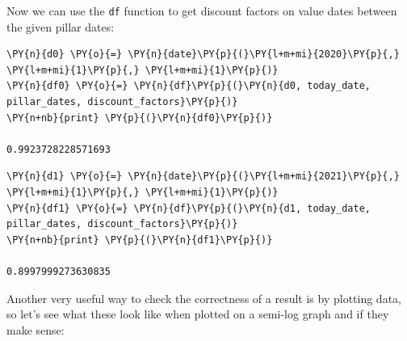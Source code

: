 Now we can use the \texttt{df} function to get discount factors on value dates between the given pillar dates:

\begin{tcolorbox}[breakable, size=fbox, boxrule=1pt, pad at break*=1mm,colback=cellbackground, colframe=cellborder]
\begin{Verbatim}[commandchars=\\\{\}]
\PY{n}{d0} \PY{o}{=} \PY{n}{date}\PY{p}{(}\PY{l+m+mi}{2020}\PY{p}{,} \PY{l+m+mi}{1}\PY{p}{,} \PY{l+m+mi}{1}\PY{p}{)}
\PY{n}{df0} \PY{o}{=} \PY{n}{df}\PY{p}{(}\PY{n}{d0, today_date, pillar_dates, discount_factors}\PY{p}{)}
\PY{n+nb}{print} \PY{p}{(}\PY{n}{df0}\PY{p}{)}

0.9923728228571693
\end{Verbatim}
\end{tcolorbox}

\begin{tcolorbox}[breakable, size=fbox, boxrule=1pt, pad at break*=1mm,colback=cellbackground, colframe=cellborder]
\begin{Verbatim}[commandchars=\\\{\}]
\PY{n}{d1} \PY{o}{=} \PY{n}{date}\PY{p}{(}\PY{l+m+mi}{2021}\PY{p}{,} \PY{l+m+mi}{1}\PY{p}{,} \PY{l+m+mi}{1}\PY{p}{)}
\PY{n}{df1} \PY{o}{=} \PY{n}{df}\PY{p}{(}\PY{n}{d1, today_date, pillar_dates, discount_factors}\PY{p}{)}
\PY{n+nb}{print} \PY{p}{(}\PY{n}{df1}\PY{p}{)}

0.8997999273630835
\end{Verbatim}
\end{tcolorbox}

Another very useful way to check the correctness of a result is by plotting data, so let's see what these look like when plotted on a semi-log graph and if they make sense:
    
